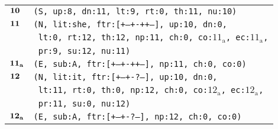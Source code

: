 \documentclass{article}
\begin{document}
\begin{minipage}{\textwidth}
{\begin{tabular}{|r|l|}
    ${\textbf{\textrm{10}}_{\phantom{z}}}$ & \texttt{\texttt{(S,~up:8,~dn:11,~lt:9,~rt:0,~th:11,~nu:10)}} \\
    ${\textbf{\textrm{11}}_{\phantom{z}}}$ & \texttt{\texttt{(N,~lit:she,~ftr:[+--+-++--],~up:10,~dn:0,}} \\
    & \texttt{\texttt{~lt:0,~rt:12,~th:12,~np:11,~ch:0,~co:${\textrm{11}_{\textrm{a}}}$,~ec:${\textrm{11}_{\textrm{a}}}$,}} \\
    & \texttt{\texttt{~pr:9,~su:12,~nu:11)}} \\
    ${\textbf{\textrm{11}}_{\textbf{\textrm{a}}}}$ & \texttt{\texttt{(E,~sub:A,~ftr:[+--+-++--],~np:11,~ch:0,~co:0)}} \\
    ${\textbf{\textrm{12}}_{\phantom{z}}}$ & \texttt{\texttt{(N,~lit:it,~ftr:[+--+-?---],~up:10,~dn:0,}} \\
    & \texttt{\texttt{~lt:11,~rt:0,~th:0,~np:12,~ch:0,~co:${\textrm{12}_{\textrm{a}}}$,~ec:${\textrm{12}_{\textrm{a}}}$,}} \\
    & \texttt{\texttt{~pr:11,~su:0,~nu:12)}} \\
    ${\textbf{\textrm{12}}_{\textbf{\textrm{a}}}}$ & \texttt{\texttt{(E,~sub:A,~ftr:[+--+-?---],~np:12,~ch:0,~co:0)}} \\
    \hline
  \end{tabular}
  }
\end{minipage}
\bigbreak
\end{document}
